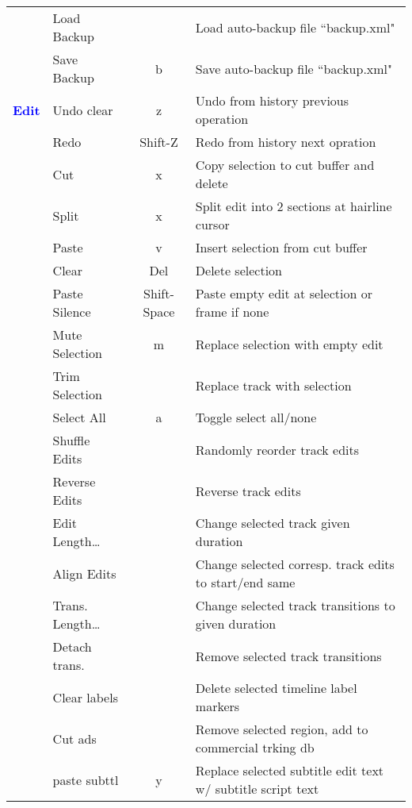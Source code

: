 \begin{center}
\begin{longtable}{>{\bfseries}c l c p{6cm}}
             & Load Backup &  & Load auto-backup file “backup.xml" \\             
             & Save Backup & b & Save auto-backup file “backup.xml" \\
             \midrule             
         \textcolor{blue}{Edit} & Undo clear & z & Undo from history previous operation \\             
             & Redo & Shift-Z & Redo from history next opration \\             
             & Cut & x & Copy selection to cut buffer and delete \\             
             & Split & x & Split edit into 2 sections at hairline cursor \\             
             & Paste & v & Insert selection from cut buffer \\             
             & Clear & Del & Delete selection \\             
             & Paste Silence & Shift-Space & Paste empty edit at selection or frame if none \\             
             & Mute Selection & m & Replace selection with empty edit \\             
             & Trim Selection &  & Replace track with selection \\             
             & Select All & a & Toggle select all/none \\             
             & Shuffle Edits &  & Randomly reorder track edits \\             
             & Reverse Edits &  & Reverse track edits \\             
             & Edit Length\dots &  & Change selected track given duration \\             
             & Align Edits &  & Change selected corresp. track edits to start/end same \\             
             & Trans. Length\dots &  & Change selected track transitions to given duration \\             
             & Detach trans. &  & Remove selected track transitions \\             
             & Clear labels &  & Delete selected timeline label markers \\             
             & Cut ads &  & Remove selected region, add to commercial trking db \\             
             & paste subttl & y & Replace selected subtitle edit text w/ subtitle script text \\

\end{longtable}
\end{center}
